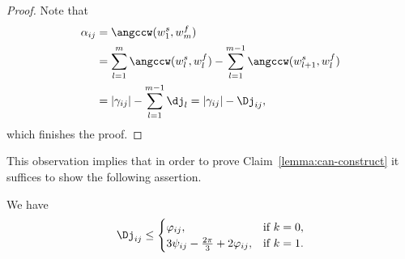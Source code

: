 \begin{proof}
Note that
\begin{align*}
\alpha_{ij} & = \angccw(w_{1}^s, w_{m}^f) \\
& = \sum_{l=1}^{m}\angccw(w_{l}^s, w_{l}^f) - \sum_{l=1}^{m-1}\angccw(w_{l+1}^s, w_{l}^f) \\
& = |\gamma_{ij}| - \sum_{l=1}^{m-1}\dj_{l} = |\gamma_{ij}| - \Dj_{ij},
\end{align*}
which finishes the proof.
\end{proof}




This observation implies that in order to prove Claim~\ref{lemma:can-construct} it suffices to show the following assertion.

\begin{claim}\label{lemma:can-construct-without-alpha} We have
$$\Dj_{ij}\leq\begin{cases}\varphi_{ij}, & \textrm{if }k = 0, \\ 3\psi_{ij} - \frac{2\pi}{3} + 2\varphi_{ij}, & \textrm{if }k = 1. \end{cases}$$
\end{claim}

